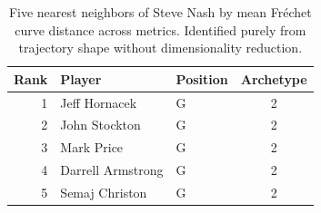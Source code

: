 \begin{table}[htbp]
  \centering\small
  \begin{tabular}{rllc}
    \toprule
    Rank & Player & Position & Archetype \\
    \midrule
    1 & Jeff Hornacek & G & 2 \\
    2 & John Stockton & G & 2 \\
    3 & Mark Price & G & 2 \\
    4 & Darrell Armstrong & G & 2 \\
    5 & Semaj Christon & G & 2 \\
    \bottomrule
  \end{tabular}
  \caption{Five nearest neighbors of Steve Nash by mean Fr\'{e}chet curve distance across metrics. Identified purely from trajectory shape without dimensionality reduction.}
  \label{tab:Steve_Nash_frechet_curve_neighbors}
\end{table}

